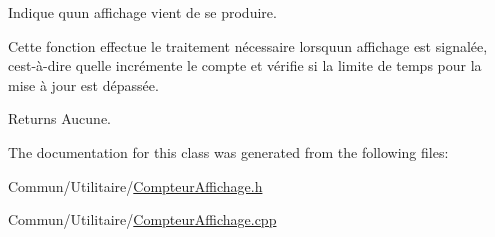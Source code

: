 Indique qu\textquotesingle{}un affichage vient de se produire. 

Cette fonction effectue le traitement nécessaire lorsqu\textquotesingle{}un affichage est signalée, c\textquotesingle{}est-\/à-\/dire qu\textquotesingle{}elle incrémente le compte et vérifie si la limite de temps pour la mise à jour est dépassée.

\begin{DoxyReturn}{Returns}
Aucune. 
\end{DoxyReturn}


The documentation for this class was generated from the following files\+:\begin{DoxyCompactItemize}
\item 
Commun/\+Utilitaire/\hyperlink{_compteur_affichage_8h}{Compteur\+Affichage.\+h}\item 
Commun/\+Utilitaire/\hyperlink{_compteur_affichage_8cpp}{Compteur\+Affichage.\+cpp}\end{DoxyCompactItemize}
